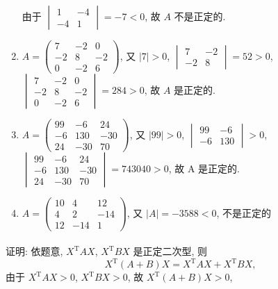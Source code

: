 \begin{enumerate}
			       由于 \( \begin{vmatrix}
				       1  & -4 \\
				       -4 & 1
			       \end{vmatrix} = -7 < 0 \), 故 \( A \) 不是正定的.
			 \item %
			       \( A = \begin{pmatrix}
				       7  & -2 & 0  \\
				       -2 & 8  & -2 \\
				       0  & -2 & 6
			       \end{pmatrix} \), 又 \( |7| > 0 \), \( \begin{vmatrix}
				       7  & -2 \\
				       -2 & 8
			       \end{vmatrix} = 52 > 0 \), \( \begin{vmatrix}
				       7  & -2 & 0  \\
				       -2 & 8  & -2 \\
				       0  & -2 & 6
			       \end{vmatrix} = 284 > 0 \), 故 \( A \) 是正定的.
			 \item %
			       \( A = \begin{pmatrix}
				       99 & -6  & 24  \\
				       -6 & 130 & -30 \\
				       24 & -30 & 70
			       \end{pmatrix} \), 又 \( |99| > 0 \), \( \begin{vmatrix}
				       99 & -6  \\
				       -6 & 130
			       \end{vmatrix} > 0 \), \( \begin{vmatrix}
				       99 & -6  & 24  \\
				       -6 & 130 & -30 \\
				       24 & -30 & 70
			       \end{vmatrix} = 743040 > 0 \), 故 A 是正定的.
			 \item %
			       \( A = \begin{pmatrix}
				       10 & 4   & 12  \\
				       4  & 2   & -14 \\
				       12 & -14 & 1
			       \end{pmatrix} \), 又 \( |A| = -3588 < 0 \), 不是正定的
		 \end{enumerate}

	 \paragraph{} %
		 证明: 依题意, \( X^{\mathrm{T}}AX \), \( X^{\mathrm{T}}BX \) 是正定二次型, 则
		 \[ X^{\mathrm{T}}(A+B)X = X^{\mathrm{T}}AX + X^{\mathrm{T}}BX, \]
		 由于 \( X^{\mathrm{T}}AX > 0 \), \( X^{\mathrm{T}}BX > 0 \), 故 \( X^{\mathrm{T}}(A+B)X > 0 \),

